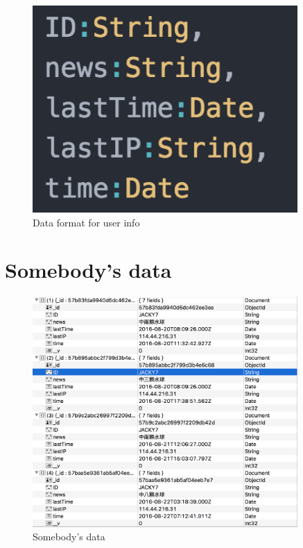 \documentclass{beamer}
\begin{document}
\begin{figure}[t]
    \centering
    \includegraphics[width=0.9\textwidth]{figures/1.png}
    \caption{Data format for user info}
\end{figure}

\section{Somebody's data}

\begin{figure}[t]
    \centering
    \includegraphics[width=0.9\textwidth]{figures/2.png}
    \caption{Somebody's data}
\end{figure}
\section{}
\end{document}
